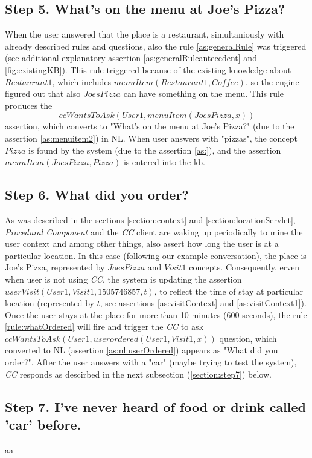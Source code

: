 \subsection{Step 5. What's on the menu at Joe's Pizza?}
\label{section:step5}
When the user answered that the place is a restaurant, simultaniously with
already described rules and questions, also the rule \ref{as:generalRule} was
triggered (see additional explanatory assertion \ref{as:generalRuleantecedent}
and \ref{fig:existingKB}). This rule triggered  
because of the existing knowledge about $Restaurant1$, which includes 
$menuItem(Restaurant1,Coffee)$, so the engine figured out that also $JoesPizza$
can have something on the menu. This rule produces the
\begin{equation*}
	ccWantsToAsk(User1,menuItem(JoesPizza,x))
\end{equation*}
assertion, which converts to "What's on the menu at Joe's 
Pizza?" (due to the assertion \ref{as:menuitem2}) in NL. When user answers with
"pizzas", the concept $Pizza$ is found by the system (due to the assertion
\ref{as:}), and the assertion $menuItem(JoesPizza,Pizza)$ is entered into the 
kb. 

\subsection{Step 6. What did you order?}
\label{section:step6}
As was described in the sections \ref{section:context} and 
\ref{section:locationServlet}, \emph{Procedural Component} and the \emph{CC} 
client are  waking up periodically to mine the user context and among other 
things, also assert how long the user is at a particular location. In this case
(following our example conversation), the place is Joe's Pizza, represented
by $JoesPizza$ and $Visit1$ concepts. Consequently, erven when user is not
using \emph{CC}, the system is updating the assertion 
$userVisit(User1,Visit1,1505746857, t)$, to reflect the time of stay at 
particular location (represented by $t$, see assertions \ref{as:visitContext} 
and \ref{as:visitContext1}). Once the user stays at the place for more than
10 minutes (600 seconds), the rule \ref{rule:whatOrdered} will fire and 
trigger the \emph{CC} to ask $ccWantsToAsk(User1,userordered(User1,Visit1,x))$
question, which converted to NL (assertion \ref{as:nl:userOrdered}) appears as 
"What did you order?". After the user answers with a "car" (maybe trying to 
test the system), \emph{CC} responds as descirbed in the next subsection 
(\autoref{section:step7}) below.

\subsection{Step 7. I've never heard of food or drink called 'car' before.}
\label{section:step7}
aa


